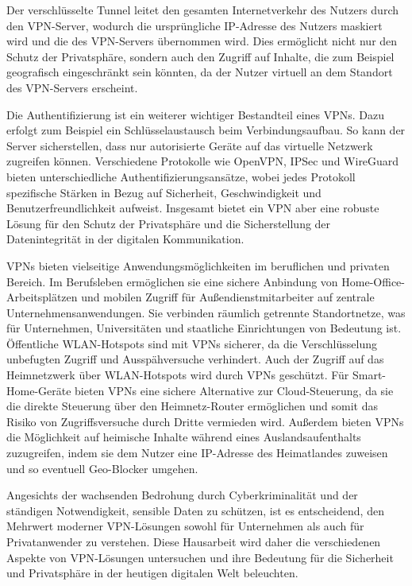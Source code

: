 Der verschlüsselte Tunnel leitet den gesamten Internetverkehr des Nutzers durch den \gls{VPN}-Server, wodurch die ursprüngliche IP-Adresse des Nutzers maskiert wird und die des \gls{VPN}-Servers übernommen wird. Dies ermöglicht nicht nur den Schutz der Privatsphäre, sondern auch den Zugriff auf Inhalte, die zum Beispiel geografisch eingeschränkt sein könnten, da der Nutzer virtuell an dem Standort des \gls{VPN}-Servers erscheint. \cite{Vergleich_der_besten_VPN-Protokolle_Nord_VPN, Wie_funktioniert_ein_Virtual_Private_Network_VPN}

Die Authentifizierung ist ein weiterer wichtiger Bestandteil eines \gls{VPN}s. Dazu erfolgt zum Beispiel ein Schlüsselaustausch beim Verbindungsaufbau. So kann der Server sicherstellen, dass nur autorisierte Geräte auf das virtuelle Netzwerk zugreifen können. Verschiedene Protokolle wie OpenVPN, \gls{IPSec} und WireGuard bieten unterschiedliche Authentifizierungsansätze, wobei jedes Protokoll spezifische Stärken in Bezug auf Sicherheit, Geschwindigkeit und Benutzerfreundlichkeit aufweist. Insgesamt bietet ein \gls{VPN} aber eine robuste Lösung für den Schutz der Privatsphäre und die Sicherstellung der Datenintegrität in der digitalen Kommunikation. \cite{Wie_funktioniert_ein_Virtual_Private_Network_VPN}

\gls{VPN}s bieten vielseitige Anwendungsmöglichkeiten im beruflichen und privaten Bereich. Im Berufsleben ermöglichen sie eine sichere Anbindung von Home-Office-Arbeitsplätzen und mobilen Zugriff für Außendienstmitarbeiter auf zentrale Unternehmensanwendungen. Sie verbinden räumlich getrennte Standortnetze, was für Unternehmen, Universitäten und staatliche Einrichtungen von Bedeutung ist. Öffentliche WLAN-Hotspots sind mit \gls{VPN}s sicherer, da die Verschlüsselung unbefugten Zugriff und Ausspähversuche verhindert. Auch der Zugriff auf das Heimnetzwerk über WLAN-Hotspots wird durch \gls{VPN}s geschützt. Für Smart-Home-Geräte bieten \gls{VPN}s eine sichere Alternative zur Cloud-Steuerung, da sie die direkte Steuerung über den Heimnetz-Router ermöglichen und somit das Risiko von Zugriffsversuche durch Dritte vermieden wird. Außerdem bieten \gls{VPN}s die Möglichkeit auf heimische Inhalte während eines Auslandsaufenthalts zuzugreifen, indem sie dem Nutzer eine \gls{IP}-Adresse des Heimatlandes zuweisen und so eventuell Geo-Blocker umgehen. \cite{Wie_funktioniert_ein_Virtual_Private_Network_VPN}

Angesichts der wachsenden Bedrohung durch Cyberkriminalität und der ständigen Notwendigkeit, sensible Daten zu schützen, ist es entscheidend, den Mehrwert moderner \gls{VPN}-Lösungen sowohl für Unternehmen als auch für Privatanwender zu verstehen. Diese Hausarbeit wird daher die verschiedenen Aspekte von \gls{VPN}-Lösungen untersuchen und ihre Bedeutung für die Sicherheit und Privatsphäre in der heutigen digitalen Welt beleuchten.